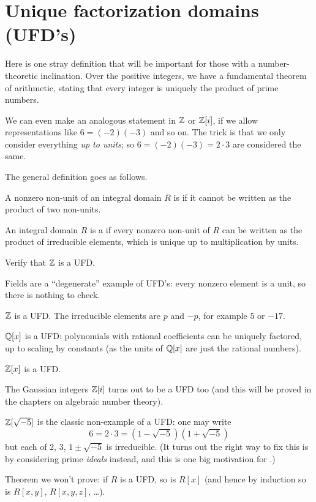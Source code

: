 \section{Unique factorization domains (UFD's)}

Here is one stray definition that will be important
for those with a number-theoretic inclination.
Over the positive integers, we have a fundamental theorem of arithmetic,
stating that every integer is uniquely the product of prime numbers.

We can even make an analogous statement in $\mathbb Z$ or $\mathbb Z[i]$,
if we allow representations like $6 = (-2)(-3)$ and so on.
The trick is that we only consider everything \emph{up to units};
so $6 = (-2)(-3) = 2 \cdot 3$ are considered the same.

The general definition goes as follows.
\begin{definition}
	A nonzero non-unit of an integral domain $R$ is
	 if it cannot be written as the product of two non-units.

	An integral domain $R$ is a 
	if every nonzero non-unit of $R$ can be written
	as the product of irreducible elements,
	which is unique up to multiplication by units.
\end{definition}
\begin{ques}
	Verify that $\mathbb Z$ is a UFD.
\end{ques}

\begin{example}
	\listhack
	\begin{enumerate}[(a)]
		\ii Fields are a ``degenerate'' example of UFD's:
		every nonzero element is a unit,
		so there is nothing to check.

		\ii $\mathbb Z$ is a UFD.
		The irreducible elements are $p$ and $-p$,
		for example $5$ or $-17$.

		\ii $\mathbb Q[x]$ is a UFD:
		polynomials with rational coefficients
		can be uniquely factored, up to scaling by constants
		(as the units of $\mathbb Q[x]$ are just the rational numbers).

		\ii $\mathbb Z[x]$ is a UFD.

		\ii The Gaussian integers $\mathbb Z[i]$ turns out to be a UFD too
		(and this will be proved in the chapters on algebraic number theory).

		\ii $\mathbb Z[\sqrt{-5}]$ is the classic non-example of a UFD:
		one may write
		\[ 6 = 2 \cdot 3 = \left( 1-\sqrt{-5} \right)
			\left( 1+\sqrt{-5} \right) \]
		but each of $2$, $3$, $1 \pm \sqrt{-5}$ is irreducible.
		(It turns out the right way to fix this is
		by considering prime \emph{ideals} instead,
		and this is one big motivation for .)

		\ii Theorem we won't prove: if $R$ is a UFD,
		so is $R[x]$ (and hence by induction so is
		$R[x,y]$, $R[x,y,z]$, \dots).
	\end{enumerate}
\end{example}

